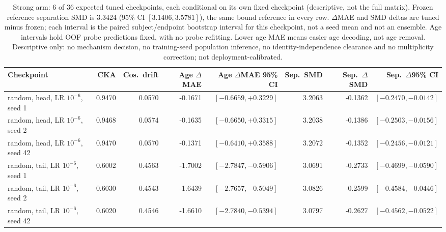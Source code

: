 \begin{table}[!t]
\caption{Strong arm: 6 of 36 expected tuned checkpoints, each conditional on its own fixed checkpoint (descriptive, not the full matrix). Frozen reference separation SMD is 3.3424 (95\% CI $[3.1406,3.5781]$), the same bound reference in every row. $\Delta$MAE and SMD deltas are tuned minus frozen; each interval is the paired subject/endpoint bootstrap interval for this checkpoint, not a seed mean and not an ensemble. Age intervals hold OOF probe predictions fixed, with no probe refitting. Lower age MAE means easier age decoding, not age removal. Descriptive only: no mechanism decision, no training-seed population inference, no identity-independence clearance and no multiplicity correction; not deployment-calibrated.}
\label{tab:common-mechanism-strong}
\centering\scriptsize
\begin{tabular}{@{}lrrrrrrr@{}}
\toprule
Checkpoint & CKA & Cos.\ drift & Age $\Delta$MAE & Age $\Delta$MAE 95\% CI & Sep.\ SMD & Sep.\ $\Delta$SMD & Sep.\ $\Delta$95\% CI \\
\midrule
random, head, LR $10^{-6}$, seed 1 & 0.9470 & 0.0570 & -0.1671 & $[-0.6659,+0.3229]$ & 3.2063 & -0.1362 & $[-0.2470,-0.0142]$ \\
random, head, LR $10^{-6}$, seed 2 & 0.9468 & 0.0574 & -0.1635 & $[-0.6650,+0.3315]$ & 3.2038 & -0.1386 & $[-0.2503,-0.0156]$ \\
random, head, LR $10^{-6}$, seed 42 & 0.9470 & 0.0570 & -0.1371 & $[-0.6410,+0.3588]$ & 3.2072 & -0.1352 & $[-0.2456,-0.0121]$ \\
random, tail, LR $10^{-6}$, seed 1 & 0.6002 & 0.4563 & -1.7002 & $[-2.7847,-0.5906]$ & 3.0691 & -0.2733 & $[-0.4699,-0.0590]$ \\
random, tail, LR $10^{-6}$, seed 2 & 0.6030 & 0.4543 & -1.6439 & $[-2.7657,-0.5049]$ & 3.0826 & -0.2599 & $[-0.4584,-0.0446]$ \\
random, tail, LR $10^{-6}$, seed 42 & 0.6020 & 0.4546 & -1.6610 & $[-2.7840,-0.5394]$ & 3.0797 & -0.2627 & $[-0.4562,-0.0522]$ \\
\bottomrule
\end{tabular}
\end{table}
